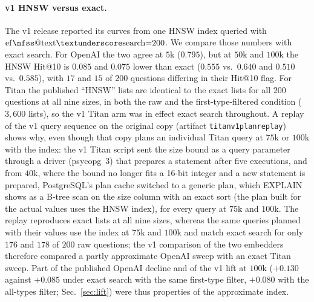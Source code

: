 \documentclass{ieeeaccess}
\makeatletter
\DeclareRobustCommand{\_}{\ifmmode\nfss@text{\textunderscore}\else\textunderscore\allowbreak\fi}
\makeatother
\begin{document}
\paragraph{v1 HNSW versus exact.}
The v1 release reported its curves from one HNSW index queried with $\mathrm{ef\_search}{=}200$. We compare those numbers with exact search. For OpenAI the two agree at $5\text{k}$ ($0.795$), but at $50\text{k}$ and $100\text{k}$ the HNSW Hit@10 is $0.085$ and $0.075$ lower than exact ($0.555$ vs.\ $0.640$ and $0.510$ vs.\ $0.585$), with $17$ and $15$ of $200$ questions differing in their Hit@10 flag. For Titan the published ``HNSW'' lists are identical to the exact lists for all $200$ questions at all nine sizes, in both the raw and the first-type-filtered condition ($3{,}600$ lists), so the v1 Titan arm was in effect exact search throughout. A replay of the v1 query sequence on the original copy (artifact \texttt{titan\_v1\_plan\_replay}) shows why, even though that copy plans an individual Titan query at $75\text{k}$ or $100\text{k}$ with the index: the v1 Titan script sent the size bound as a query parameter through a driver (psycopg~3) that prepares a statement after five executions, and from $40\text{k}$, where the bound no longer fits a 16-bit integer and a new statement is prepared, PostgreSQL's plan cache switched to a generic plan, which EXPLAIN shows as a B-tree scan on the size column with an exact sort (the plan built for the actual values uses the HNSW index), for every query at $75\text{k}$ and $100\text{k}$. The replay reproduces exact lists at all nine sizes, whereas the same queries planned with their values use the index at $75\text{k}$ and $100\text{k}$ and match exact search for only $176$ and $178$ of $200$ raw questions; the v1 comparison of the two embedders therefore compared a partly approximate OpenAI sweep with an exact Titan sweep. Part of the published OpenAI decline and of the v1 lift at $100\text{k}$ ($+0.130$ against $+0.085$ under exact search with the same first-type filter, $+0.080$ with the all-types filter; Sec.~\ref{sec:lift}) were thus properties of the approximate index.
\end{document}
